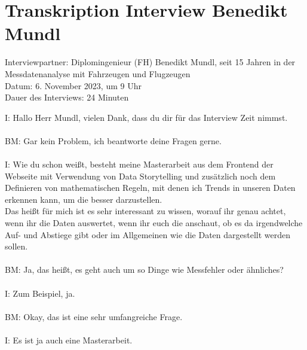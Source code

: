 \section{Transkription Interview Benedikt Mundl}
\label{appendix:interview_trends_mundl}
Interviewpartner: Diplomingenieur (FH) Benedikt Mundl, seit 15 Jahren in der Messdatenanalyse mit Fahrzeugen und Flugzeugen\\
Datum: 6. November 2023, um 9 Uhr\\
Dauer des Interviews: 24 Minuten\\

\begin{linenumbers}
\noindent
I: Hallo Herr Mundl, vielen Dank, dass du dir für das Interview Zeit nimmst.\\\\
BM: Gar kein Problem, ich beantworte deine Fragen gerne.\\\\
I: Wie du schon weißt, besteht meine Masterarbeit aus dem Frontend der Webseite mit Verwendung von Data Storytelling und zusätzlich noch dem Definieren von mathematischen Regeln, mit denen ich Trends in unseren Daten erkennen kann, um die besser darzustellen.\\
Das heißt für mich ist es sehr interessant zu wissen, worauf ihr genau achtet, wenn ihr die Daten auswertet, wenn ihr euch die anschaut, ob es da irgendwelche Auf- und Abstiege gibt oder im Allgemeinen wie die Daten dargestellt werden sollen.\\\\
BM: Ja, das heißt, es geht auch um so Dinge wie Messfehler oder ähnliches?\\\\
I: Zum Beispiel, ja.\\\\
BM: Okay, das ist eine sehr umfangreiche Frage.\\\\
I: Es ist ja auch eine Masterarbeit.\\\\

\end{linenumbers}
